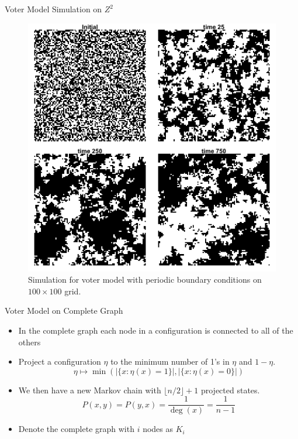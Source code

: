 \documentclass{beamer}
\theoremstyle{definition}
\begin{document}
\begin{frame}{Voter Model Simulation on $Z^2$}
\begin{figure}[H]
  \centering
    \includegraphics[width=.6\textwidth]{figures/voter_simulation_torus_100.png}
   \caption{Simulation for voter model with periodic boundary conditions on $100 \times 100$ grid.}
  \label{fig:voter_sim_2d_torus.png}
\end{figure}
\end{frame}

\begin{frame}{Voter Model on Complete Graph}
    \begin{itemize}
        \item In the complete graph each node in a configuration is connected to all of the others
        \item Project a configuration $\eta$ to the minimum number of 1's in $\eta$ and $1 - \eta$.
        $$
        \eta \mapsto \min\left(|\{x : \eta(x) = 1\}|, |\{x : \eta(x) = 0\}|  \right)
        $$
        \item We then have a new Markov chain with $\lfloor n/2 \rfloor + 1$ projected states.
        $$
        P(x,y) = P(y,x) = \frac{1}{\deg(x)} = \frac{1}{n - 1}
        $$
        \item Denote the complete graph with $i$ nodes as $K_i$
    \end{itemize}
\end{frame}
\end{document}
